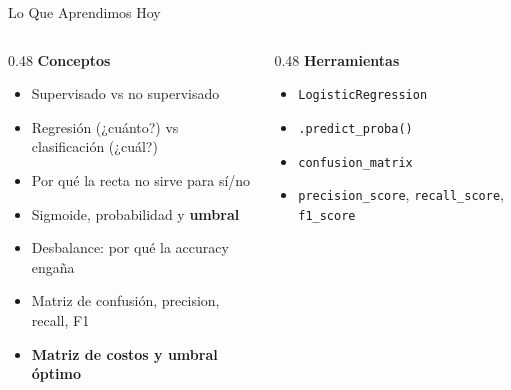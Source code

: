 \documentclass[aspectratio=169, 11pt]{beamer}
\begin{document}
\begin{frame}{Lo Que Aprendimos Hoy}
  \vspace{-6pt}
  \begin{columns}[T]
    \begin{column}{0.48\textwidth}
      {\footnotesize\color{arcaDark}\bfseries Conceptos}
      \vspace{3pt}
      {\footnotesize\color{textMuted}
      \begin{itemize}\setlength{\itemsep}{2pt}
        \item[{\color{codeGreen}\scriptsize\faCheck}]
          Supervisado vs no supervisado
        \item[{\color{codeGreen}\scriptsize\faCheck}]
          Regresión (¿cuánto?) vs clasificación (¿cuál?)
        \item[{\color{codeGreen}\scriptsize\faCheck}]
          Por qué la recta no sirve para sí/no
        \item[{\color{codeGreen}\scriptsize\faCheck}]
          Sigmoide, probabilidad y \textbf{umbral}
        \item[{\color{codeGreen}\scriptsize\faCheck}]
          Desbalance: por qué la accuracy engaña
        \item[{\color{codeGreen}\scriptsize\faCheck}]
          Matriz de confusión, precision, recall, F1
        \item[{\color{codeGreen}\scriptsize\faStar}]
          \textbf{Matriz de costos y umbral óptimo}
      \end{itemize}
      }
    \end{column}
    \begin{column}{0.48\textwidth}
      {\footnotesize\color{arcaDark}\bfseries Herramientas}
      \vspace{3pt}
      {\footnotesize\color{textMuted}
      \begin{itemize}\setlength{\itemsep}{2pt}
        \item[{\color{arcaRed}\scriptsize\faTools}]
          \texttt{LogisticRegression}
        \item[{\color{arcaRed}\scriptsize\faTools}]
          \texttt{.predict\_proba()}
        \item[{\color{arcaRed}\scriptsize\faTools}]
          \texttt{confusion\_matrix}
        \item[{\color{arcaRed}\scriptsize\faTools}]
          \texttt{precision\_score}, \texttt{recall\_score}, \texttt{f1\_score}

\end{itemize}}
\end{column}
\end{columns}
\end{frame}
\end{document}
